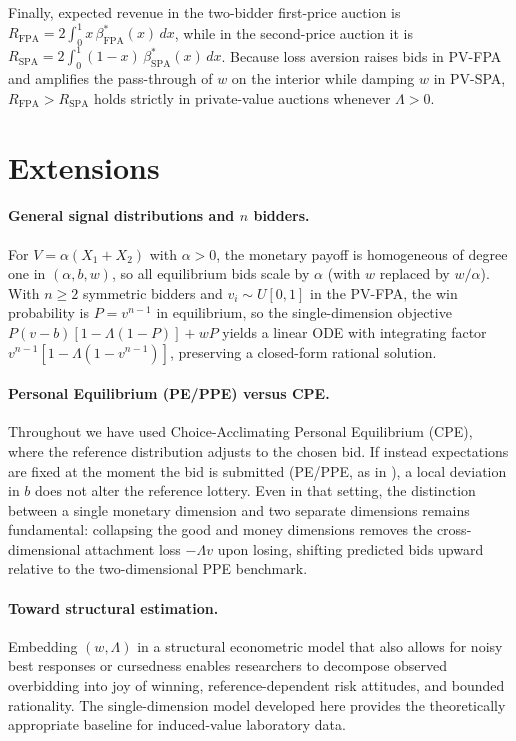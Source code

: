 \documentclass[11pt,a4paper]{article}
\theoremstyle{remark}
\begin{document}
Finally, expected revenue in the two-bidder first-price auction is
$R_{\mathrm{FPA}}=2\int_0^1 x\,\beta_{\mathrm{FPA}}^*(x)\,dx$, while in the
second-price auction it is
$R_{\mathrm{SPA}}=2\int_0^1 (1-x)\,\beta_{\mathrm{SPA}}^*(x)\,dx$. Because loss
aversion raises bids in PV-FPA and amplifies the pass-through of $w$ on the interior
 while damping $w$ in PV-SPA, $R_{\mathrm{FPA}} > R_{\mathrm{SPA}}$ holds strictly in
private-value auctions whenever $\Lambda>0$.

\section{Extensions}
\label{sec:ext}
\paragraph{General signal distributions and $n$ bidders.}
For $V=\alpha(X_1+X_2)$ with $\alpha>0$, the monetary payoff is homogeneous of
degree one in $(\alpha,b,w)$, so all equilibrium bids scale by $\alpha$ (with $w$
replaced by $w/\alpha$). With $n\ge 2$ symmetric bidders and $v_i\sim U[0,1]$ in the
PV-FPA, the win probability is $P=v^{n-1}$ in equilibrium, so the single-dimension
objective $P(v-b)[1-\Lambda(1-P)]+wP$ yields a linear ODE with integrating factor
$v^{n-1}[1-\Lambda(1-v^{n-1})]$, preserving a closed-form rational solution.

\paragraph{Personal Equilibrium (PE/PPE) versus CPE.}
Throughout we have used Choice-Acclimating Personal Equilibrium (CPE), where the
reference distribution adjusts to the chosen bid. If instead expectations are fixed
at the moment the bid is submitted (PE/PPE, as in \citealt{langeRatan2010}), a local
deviation in $b$ does not alter the reference lottery. Even in that setting, the
distinction between a single monetary dimension and two separate dimensions remains
fundamental: collapsing the good and money dimensions removes the cross-dimensional
attachment loss $-\Lambda v$ upon losing, shifting predicted bids upward relative to
the two-dimensional PPE benchmark.

\paragraph{Toward structural estimation.}
Embedding $(w,\Lambda)$ in a structural econometric model that also allows for noisy
best responses \citep{goeree2002} or cursedness \citep{eysterRabin2005} enables
researchers to decompose observed overbidding into joy of winning, reference-dependent
risk attitudes, and bounded rationality. The single-dimension model developed here
provides the theoretically appropriate baseline for induced-value laboratory data.
\end{document}
